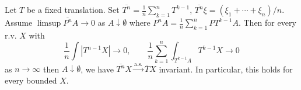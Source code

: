 Let $T$ be a fixed translation. Set $\overline{T^n}=\frac{1}{n}\sum_{k=1}^n T^{k-1}$, $\overline{T^n}\xi=(\xi_1+\cdots+\xi_n)/n$. Assume $\limsup\overline{P^n}A\to 0$ as $A\downarrow\emptyset$ where $\overline{P^n}A=\frac{1}{n}\sum_{k=1}^n PT^{k-1}A$. Then for every r.v. $X$ with
$$\frac{1}{n}\int|T^{n-1}X|\to 0,\qquad \frac{1}{n}\sum_{k=1}^n\int_{T^{k-1}A}T^{k-1}X\to 0$$
as $n\to\infty$ then $A\downarrow\emptyset$, we have $\overline{T^n}X\xrightarrow{\text{a.s.}}\overline{T}X$ invariant. In particular, this holds for every bounded $X$.
